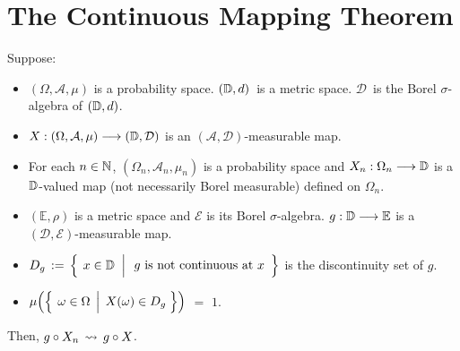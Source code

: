 

\section{The Continuous Mapping Theorem}
\setcounter{theorem}{0}
\setcounter{equation}{0}


\renewcommand{\theenumi}{\roman{enumi}}
\renewcommand{\labelenumi}{\textnormal{(\theenumi)}$\;\;$}


\begin{theorem}
\mbox{}\vskip 0.1cm
\noindent
Suppose:
\begin{itemize}
\item
	$(\Omega,\mathcal{A},\mu)$ is a probability space.
	$(\mathbb{D},d)$\, is a metric space.
	$\mathcal{D}$\, is the Borel $\sigma$-algebra of $(\mathbb{D},d)$.
\item
	$X : (\Omega,\mathcal{A},\mu) \longrightarrow (\mathbb{D},\mathcal{D})$
	is an $(\mathcal{A},\mathcal{D})$-measurable map.
\item
	For each $n \in \mathbb{N}$,
	$(\Omega_{n},\mathcal{A}_{n},\mu_{n})$ is a probability space and
	$X_{n} : \Omega_{n} \longrightarrow \mathbb{D}$
	is a $\mathbb{D}$-valued map (not necessarily Borel measurable) defined on $\Omega_{n}$.
\item
	$(\mathbb{E},\rho)$ is a metric space and $\mathcal{E}$ is its Borel $\sigma$-algebra.
	$g : \mathbb{D} \longrightarrow \mathbb{E}$ is a $(\mathcal{D},\mathcal{E})$-measurable map.
\item
	$D_{g} \, := \,
	\left\{\;\left.
		x\overset{{\color{white}.}}{\in}\D
		\;\;\right\vert
		\begin{array}{c}\textnormal{$g$ is not continuous at $x$}\end{array}
		\right\}$
	is the discontinuity set of $g$.
\item
	$\mu\!\left(\left\{\;\left.\omega\overset{{\color{white}.}}{\in}\Omega\;\,\right\vert\;X(\omega)\in D_{g}\;\right\}\right)$
	\;$=$\; $1$.
\end{itemize}
Then, \;$g \circ X_{n} \,\rightsquigarrow\, g \circ X$.
\end{theorem}
\proof

